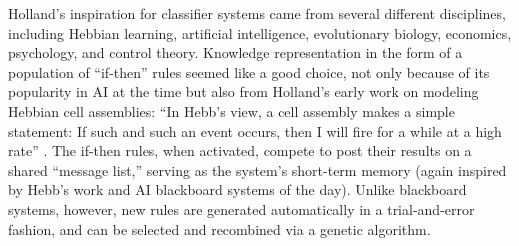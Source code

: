 \documentclass{sig-alternate}
\begin{document}






Holland's inspiration for classifier systems came from several
different disciplines, including Hebbian
learning, artificial intelligence, evolutionary biology, economics,
psychology, and control theory.
Knowledge representation in the form of a population of ``if-then''
rules seemed like a good choice, not only because of its popularity in
AI at the time but also from Holland's early work on modeling Hebbian
cell assemblies: ``In Hebb's view, a cell assembly makes a simple
statement: If such and such an event occurs, then I will fire for a
while at a high rate'' \cite{Waldrop1993}.  The if-then rules, when
activated, compete to post their results on a shared ``message list,''
serving as the system's short-term memory (again inspired by Hebb's
work and AI blackboard systems of the day).  Unlike blackboard
systems, however, new rules are generated automatically in a
trial-and-error fashion, and can be selected and recombined via a
genetic algorithm.
\end{document}
